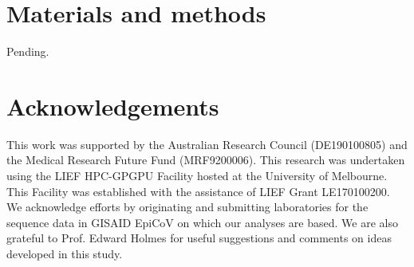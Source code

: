 \documentclass[11pt]{article}
\begin{document}
\section{Materials and methods}
Pending.


\section{Acknowledgements}
This work was supported by the Australian Research Council (DE190100805) and the Medical Research Future Fund (MRF9200006). This research was undertaken using the LIEF HPC-GPGPU Facility hosted at the University of Melbourne. This Facility was established with the assistance of LIEF Grant LE170100200. We acknowledge efforts by originating and submitting laboratories for the sequence data in GISAID EpiCoV on which our analyses are based. We are also grateful to Prof. Edward Holmes for useful suggestions and comments on ideas developed in this study.



%

\end{document}
